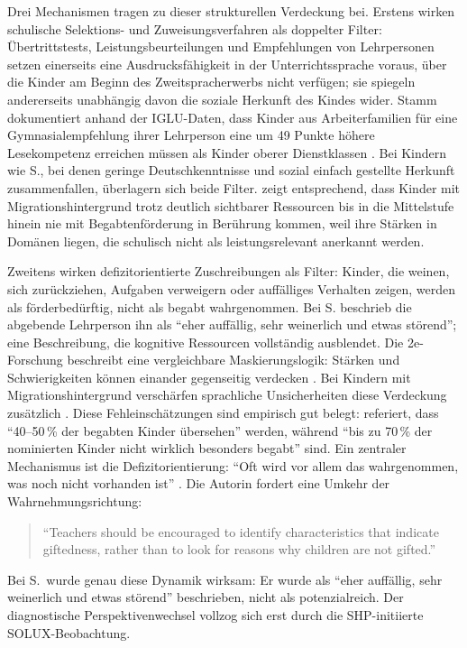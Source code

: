 \documentclass[ngerman, a4paper]{article}
\begin{document}
Drei Mechanismen tragen zu dieser strukturellen Verdeckung bei. Erstens
wirken schulische Selektions- und Zuweisungsverfahren als doppelter Filter:
Übertrittstests, Leistungsbeurteilungen und Empfehlungen von Lehrpersonen
setzen einerseits eine Ausdrucksfähigkeit in der Unterrichtssprache voraus,
über die Kinder am Beginn des Zweitspracherwerbs nicht verfügen; sie
spiegeln andererseits unabhängig davon die soziale Herkunft des Kindes
wider. Stamm dokumentiert anhand der IGLU-Daten, dass Kinder aus
Arbeiterfamilien für eine Gymnasialempfehlung ihrer Lehrperson eine um
49 Punkte höhere Lesekompetenz erreichen müssen als Kinder oberer
Dienstklassen \parencite[S.\,36--37]{stamm2025vonuntennachoben}. Bei
Kindern wie S., bei denen geringe Deutschkenntnisse und sozial einfach
gestellte Herkunft zusammenfallen, überlagern sich beide Filter.
\textcite[S.\,76--78]{kellerkoller2025hellekoepfe} zeigt entsprechend, dass
Kinder mit Migrationshintergrund trotz deutlich sichtbarer Ressourcen bis
in die Mittelstufe hinein nie mit Begabtenförderung in Berührung kommen,
weil ihre Stärken in Domänen liegen, die schulisch nicht als
leistungsrelevant anerkannt werden.

Zweitens wirken defizitorientierte Zuschreibungen als Filter: Kinder, die weinen,
sich zurückziehen, Aufgaben verweigern oder auffälliges Verhalten zeigen, werden
als förderbedürftig, nicht als begabt wahrgenommen. Bei S. beschrieb die abgebende
Lehrperson ihn als \enquote{eher auffällig, sehr weinerlich und etwas störend}; eine
Beschreibung, die kognitive Ressourcen vollständig ausblendet.
Die 2e-Forschung beschreibt eine vergleichbare Maskierungslogik:
Stärken und Schwierigkeiten können einander gegenseitig verdecken
\parencite[S.\,588--598]{baumschader2021twice}. Bei Kindern mit
Migrationshintergrund verschärfen sprachliche Unsicherheiten diese
Verdeckung zusätzlich \parencite[S.\,576--585]{stamm2021fehlenderblick}.
Diese Fehleinschätzungen sind empirisch gut belegt:
\textcite[S.\,228]{muelleroppliger2021paeddiagnostik} referiert, dass
\enquote{40--50\,\% der begabten Kinder übersehen} werden, während
\enquote{bis zu 70\,\% der nominierten Kinder nicht wirklich besonders
  begabt} sind. Ein zentraler Mechanismus ist die Defizitorientierung:
\enquote{Oft wird vor allem das wahrgenommen, was noch nicht vorhanden
  ist} \parencite[S.\,228]{muelleroppliger2021paeddiagnostik}. Die Autorin
fordert eine Umkehr der Wahrnehmungsrichtung:
\begin{quote}
  \foreignlanguage{english}{\enquote{Teachers \textelp{} should be
      encouraged to identify characteristics that indicate giftedness, rather
      than to look for reasons why children are not gifted.}}
  \parencite[S.\,228]{muelleroppliger2021paeddiagnostik}
\end{quote}
Bei S.\ wurde genau diese Dynamik wirksam: Er wurde als \enquote{eher
  auffällig, sehr weinerlich und etwas störend} beschrieben, nicht als
potenzialreich. Der diagnostische Perspektivenwechsel vollzog sich erst
durch die SHP-initiierte SOLUX-Beobachtung.
\end{document}
